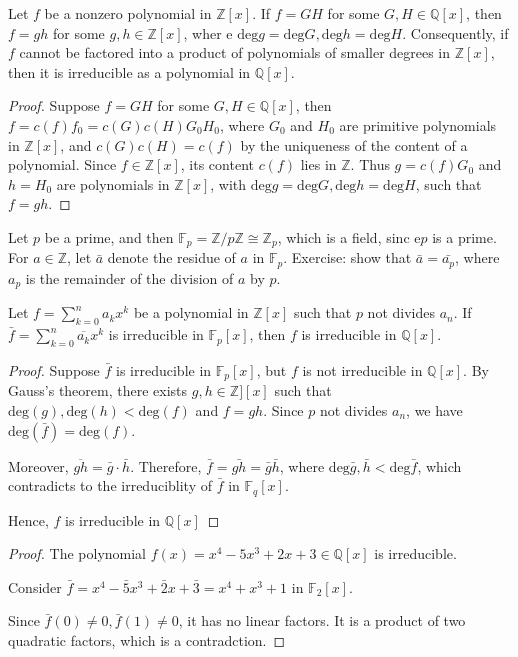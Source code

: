 \begin{theorem}
Let $f$ be a nonzero polynomial in $\mathbb{Z}[x]$. If $f=GH$ for some $G,H\in\mathbb{Q}[x]$, then $f=gh$ for some $g,h\in\mathbb{Z}[x]$, wher e $\mbox{deg}g=\mbox{deg}G,\mbox{deg}h=\mbox{deg}H$. Consequently, if $f$ cannot be factored into a product of polynomials of smaller degrees in $\mathbb{Z}[x]$, then it is irreducible as a polynomial in $\mathbb{Q}[x]$.
\end{theorem}
\begin{proof}
Suppose $f=GH$ for some $G,H\in\mathbb{Q}[x]$, then $f=c(f)f_0=c(G)c(H)G_0H_0$, where $G_0$ and $H_0$ are primitive polynomials in $\mathbb{Z}[x]$, and $c(G)c(H)=c(f)$ by the uniqueness of the content of a polynomial. Since $f\in\mathbb{Z}[x]$, its content $c(f)$ lies in $\mathbb{Z}$. Thus $g=c(f)G_0$ and $h=H_0$ are polynomials in $\mathbb{Z}[x]$, with $\mbox{deg}g=\mbox{deg}G,\mbox{deg}h=\mbox{deg}H$, such that $f=gh$.
\end{proof}
Let $p$ be a prime, and then $\mathbb{F}_p=\mathbb{Z}/p\mathbb{Z}\cong\mathbb{Z}_p$, which is a field, sinc e$p$ is a prime. For $a\in\mathbb{Z}$, let $\bar{a}$ denote the residue of $a$ in $\mathbb{F}_p$. Exercise: show that $\bar{a}=\bar{a_p}$, where $a_p$ is the remainder of the division of $a$ by $p$.
\begin{theorem}
Let $f=\sum_{k=0}^na_kx^k$ be a polynomial in $\mathbb{Z}[x]$ such that $p$ not divides $a_n$. If $\bar f=\sum_{k=0}^n\overline{a_k}x^k$ is irreducible in $\mathbb{F}_p[x]$, then $f$ is irreducible in $\mathbb{Q}[x]$.
\end{theorem}
\begin{proof}
Suppose $\bar f$ is irreducible in $\mathbb{F}_p[x]$, but $f$ is not irreducible in $\mathbb{Q}[x]$. By Gauss's theorem, there exists $g,h\in\mathbb{Z}][x]$ such that $\mbox{deg}(g),\mbox{deg}(h)<\mbox{deg}(f)$ and $f=gh$. Since $p$ not divides $a_n$, we have $\mbox{deg}(\bar f)=\mbox{deg}(f)$.

Moreover, $\overline{gh}=\bar g\cdot\bar h$. Therefore, $\bar f=\bar{gh}=\bar g\bar h$, where $\mbox{deg}\bar g,\bar h<\mbox{deg}\bar f$, which contradicts to the irreduciblity of $\bar f$ in $\mathbb{F}_q[x]$.

Hence, $f$ is irreducible in $\mathbb{Q}[x]$
\end{proof}
\begin{proof}
The polynomial $f(x)=x^4-5x^3+2x+3\in\mathbb{Q}[x]$ is irreducible.

Consider $\bar f=x^4-\bar 5x^3+\bar 2x+\bar 3=x^4+x^3+1$ in $\mathbb{F}_2[x]$.

Since $\bar f(0)\ne0,\bar f(1)\ne0$, it has no linear factors.  It is a product of two quadratic factors, which is a contradction. 
\end{proof}

